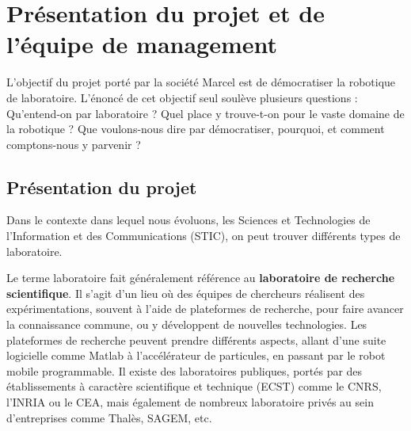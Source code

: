 \documentclass[a4paper,12pt]{report}
\begin{document}




\section{Présentation du projet et de l'équipe de management}

L'objectif du projet porté par la société Marcel est de démocratiser la robotique de laboratoire.
L'énoncé de cet objectif seul soulève plusieurs questions : Qu'entend-on par laboratoire ? Quel place y trouve-t-on pour le vaste domaine de la robotique ?
Que voulons-nous dire par démocratiser, pourquoi, et comment comptons-nous y parvenir ?\\

\subsection{Présentation du projet}
Dans le contexte dans lequel nous évoluons, les Sciences et Technologies de l'Information et des Communications (STIC),
on peut trouver différents types de \og{}laboratoire\fg{}.

Le terme laboratoire fait généralement référence au \textbf{laboratoire de recherche scientifique}.
Il s'agit d'un lieu où des équipes de chercheurs réalisent des expérimentations, souvent à l'aide de plateformes de recherche,
pour faire avancer la connaissance commune, ou y développent de nouvelles technologies.
Les plateformes de recherche peuvent prendre différents aspects, allant d'une suite logicielle comme Matlab à l'accélérateur de particules, en passant par le robot mobile programmable.
Il existe des laboratoires publiques, portés par des établissements à caractère scientifique et technique (ECST) comme le CNRS, l'INRIA ou le CEA, mais également de nombreux laboratoire privés au sein d'entreprises comme Thalès, SAGEM, etc.
\end{document}
